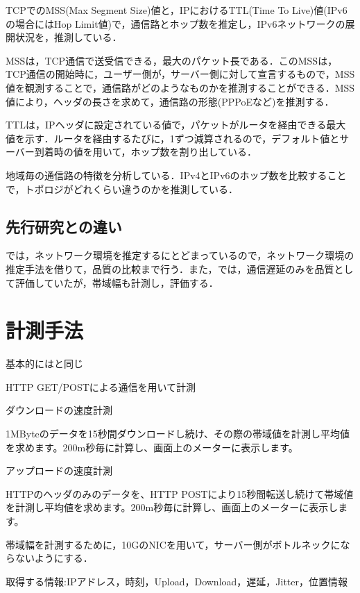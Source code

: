 \documentclass[rinkou,a4paper]{ieicej}
\begin{document}
TCPでのMSS(Max Segment Size)値と，IPにおけるTTL(Time To Live)値(IPv6の場合にはHop Limit値)で，通信路とホップ数を推定し，IPv6ネットワークの展開状況を，推測している．

MSSは，TCP通信で送受信できる，最大のパケット長である．このMSSは，TCP通信の開始時に，ユーザー側が，サーバー側に対して宣言するもので，MSS値を観測することで，通信路がどのようなものかを推測することができる．MSS値により，ヘッダの長さを求めて，通信路の形態(PPPoEなど)を推測する．

TTLは，IPヘッダに設定されている値で，パケットがルータを経由できる最大値を示す．ルータを経由するたびに，1ずつ減算されるので，デフォルト値とサーバー到着時の値を用いて，ホップ数を割り出している．

地域毎の通信路の特徴を分析している．IPv4とIPv6のホップ数を比較することで，トポロジがどれくらい違うのかを推測している．

\subsection{先行研究との違い}
\cite{kitaguchi2}では，ネットワーク環境を推定するにとどまっているので，ネットワーク環境の推定手法を借りて，品質の比較まで行う．また，\cite{kitaguchi1}では，通信遅延のみを品質として評価していたが，帯域幅も計測し，評価する．

\section{計測手法}
基本的には\cite{inonius}と同じ

HTTP GET/POSTによる通信を用いて計測

ダウンロードの速度計測

1MByteのデータを15秒間ダウンロードし続け、その際の帯域値を計測し平均値を求めます。200m秒毎に計算し、画面上のメーターに表示します。

アップロードの速度計測

HTTPのヘッダのみのデータを、HTTP POSTにより15秒間転送し続けて帯域値を計測し平均値を求めます。200m秒毎に計算し、画面上のメーターに表示します。

帯域幅を計測するために，10GのNICを用いて，サーバー側がボトルネックにならないようにする．

取得する情報:IPアドレス，時刻，Upload，Download，遅延，Jitter，位置情報
\end{document}
